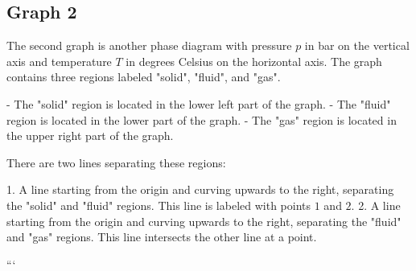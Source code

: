 \subsection*{Graph 2}

The second graph is another phase diagram with pressure \( p \) in bar on the vertical axis and temperature \( T \) in degrees Celsius on the horizontal axis. The graph contains three regions labeled "solid", "fluid", and "gas". 

- The "solid" region is located in the lower left part of the graph.
- The "fluid" region is located in the lower part of the graph.
- The "gas" region is located in the upper right part of the graph.

There are two lines separating these regions:

1. A line starting from the origin and curving upwards to the right, separating the "solid" and "fluid" regions. This line is labeled with points \( 1 \) and \( 2 \).
2. A line starting from the origin and curving upwards to the right, separating the "fluid" and "gas" regions. This line intersects the other line at a point.

```